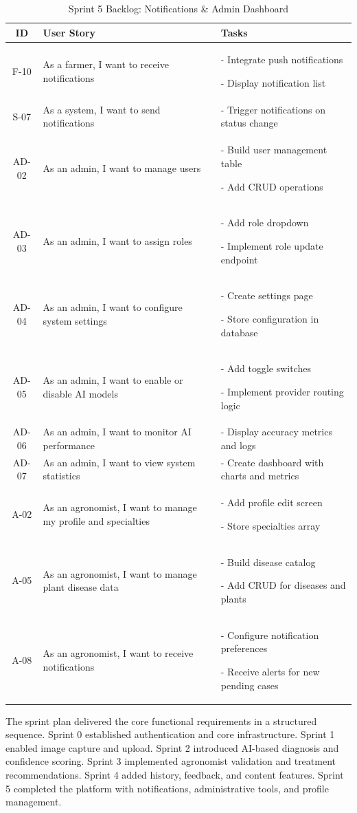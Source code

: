 \documentclass[12pt]{article}
\begin{document}
\begin{table}[H]
\centering
\caption{Sprint 5 Backlog: Notifications \& Admin Dashboard}
\label{tab:sprint5}
\begin{tabular}{|c|p{8cm}|p{8cm}|}
\hline
\textbf{ID} & \textbf{User Story} & \textbf{Tasks} \\
\hline
F-10 & As a farmer, I want to receive notifications & - Integrate push notifications \par - Display notification list \\
\hline
S-07 & As a system, I want to send notifications & - Trigger notifications on status change \\
\hline
AD-02 & As an admin, I want to manage users & - Build user management table \par - Add CRUD operations \\
\hline
AD-03 & As an admin, I want to assign roles & - Add role dropdown \par - Implement role update endpoint \\
\hline
AD-04 & As an admin, I want to configure system settings & - Create settings page \par - Store configuration in database \\
\hline
AD-05 & As an admin, I want to enable or disable AI models & - Add toggle switches \par - Implement provider routing logic \\
\hline
AD-06 & As an admin, I want to monitor AI performance & - Display accuracy metrics and logs \\
\hline
AD-07 & As an admin, I want to view system statistics & - Create dashboard with charts and metrics \\
\hline
A-02 & As an agronomist, I want to manage my profile and specialties & - Add profile edit screen \par - Store specialties array \\
\hline
A-05 & As an agronomist, I want to manage plant disease data & - Build disease catalog \par - Add CRUD for diseases and plants \\
\hline
A-08 & As an agronomist, I want to receive notifications & - Configure notification preferences \par - Receive alerts for new pending cases \\
\hline
\end{tabular}
\end{table}

The sprint plan delivered the core functional requirements in a structured sequence. Sprint 0 established authentication and core infrastructure. Sprint 1 enabled image capture and upload. Sprint 2 introduced AI-based diagnosis and confidence scoring. Sprint 3 implemented agronomist validation and treatment recommendations. Sprint 4 added history, feedback, and content features. Sprint 5 completed the platform with notifications, administrative tools, and profile management.
\end{document}

